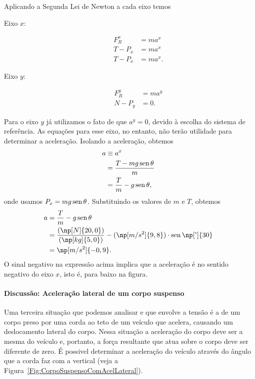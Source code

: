 Aplicando a Segunda Lei de Newton a cada eixo temos
\begin{description}
    \item[Eixo $x$:]
        \begin{align}
            F_R^x &= m a^x \\
            T - P_x &= m a^x \\
            T - P_x &= m a^x.
        \end{align}
    \item[Eixo $y$:]
        \begin{align}
            F_R^y &= m a^y \\
            N - P_y &= 0.
        \end{align}
\end{description}
%
Para o eixo $y$ já utilizamos o fato de que $a^y = 0$, devido à escolha do sistema de referência. As equações para esse eixo, no entanto, não terão utilidade para determinar a aceleração. Isolando a aceleração, obtemos
\begin{align}
    a &\equiv a^x \\
    &= \frac{T - mg\operatorname{sen}\theta}{m} \\
    &= \frac{T}{m} - g\operatorname{sen}\theta,
\end{align}
%
onde usamos $P_x = mg\operatorname{sen}\theta$. Substituindo os valores de $m$ e $T$, obtemos
\begin{align}
    a &= \frac{T}{m} - g\sen\theta \\
    &= \frac{(\np[N]{20,0})}{(\np[kg]{5,0})} - (\np[m/s^2]{9,8})\cdot\sen\np[\tcdegree]{30} \\
    &= \np[m/s^2]{-0,9}.
\end{align}
%
O sinal negativo na expressão acima implica que a aceleração é no sentido negativo do eixo $x$, isto é, para baixo na figura.

\paragraph{Discussão: Aceleração lateral de um corpo suspenso}

Uma terceira situação que podemos analisar e que envolve a tensão é a de um corpo preso por uma corda ao teto de um veículo que acelera, causando um deslocamento lateral do corpo. Nessa situação a aceleração do corpo deve ser a mesma do veículo e, portanto, a força resultante que atua sobre o corpo deve ser diferente de zero. É possivel determinar a aceleração do veículo através do ângulo que a corda faz com a vertical (veja a Figura~\ref{Fig:CorpoSuspensoComAcelLateral}).

